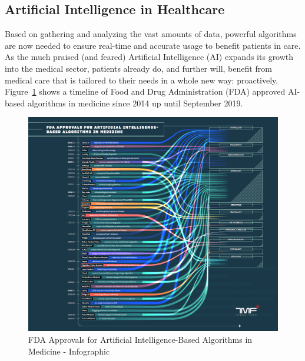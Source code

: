 \subsection{Artificial Intelligence in Healthcare}
Based on gathering and analyzing the vast amounts of data, powerful algorithms are now needed to ensure real-time and accurate usage to benefit patients in care. As the much praised (and feared) Artificial Intelligence (AI) expands its growth into the medical sector, patients already do, and further will, benefit from medical care that is tailored to their needs in a whole new way: proactively. Figure~\ref{fig:FDA_AI_Info} shows a timeline of Food and Drug Administration (FDA) approved AI-based algorithms in medicine since 2014 up until September 2019.
\begin{figure}[htp]
    \centering
    \includegraphics[width=\textwidth]{media/The-Medical-Futurist-FDA-approved-AI-algorithms-in-medicine-2019-09.png}
    \caption{FDA Approvals for Artificial Intelligence-Based Algorithms in Medicine - Infographic \cite{fdaAi}}%
    \label{fig:FDA_AI_Info}
\end{figure}
